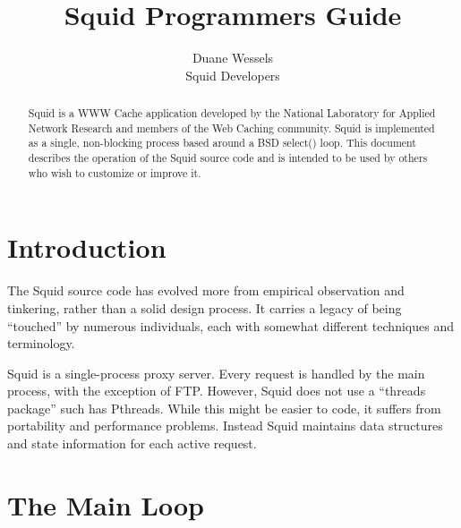 
\newenvironment{SS}{\singlespace}{}





\author{Duane Wessels\\
Squid Developers}
\title{Squid Programmers Guide}

\maketitle

\begin{abstract}
Squid is a WWW Cache application developed by the National Laboratory
for Applied Network Research and members of the Web Caching community.
Squid is implemented as a single, non-blocking process based around
a BSD select() loop.  This document describes the operation of the Squid
source code and is intended to be used by others who wish to customize
or improve it.
\end{abstract}

\chapter{Introduction}

The Squid source code has evolved more from empirical observation and
tinkering, rather than a solid design process.  It carries a legacy of
being ``touched'' by numerous individuals, each with somewhat different
techniques and terminology.  

Squid is a single-process proxy server.  Every request is handled by
the main process, with the exception of FTP.  However, Squid does not
use a ``threads package'' such has Pthreads.  While this might be 
easier to code, it suffers from portability and performance problems.
Instead Squid maintains data structures and state information for
each active request.

\chapter{The Main Loop}

